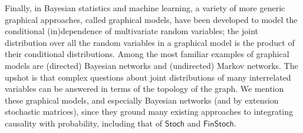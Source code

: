\documentclass[sigconf]{acmart}
\newcommand{\redout}[1]{{\color{red}#1}}
\newcommand{\Cat}[1]{\mathsf{#1}}
\def\Stoch{\Cat{Stoch}}
\def\FinStoch{\Cat{FinStoch}}
\begin{document}

Finally, in Bayesian statistics and machine learning, a variety of more generic graphical approaches, called graphical models, have been developed to model the conditional (in)dependence of multivariate random variables; the joint distribution over all the random variables in a graphical model is the product of their conditional distributions. Among the most familiar examples of graphical models are (directed) Bayesian networks and (undirected) Markov networks. The upshot is that complex questions about joint distributions of many interrelated variables can be answered in terms of the topology of the graph. We mention these graphical models, and especially Bayesian networks (and by extension stochastic matrices), since they ground many existing approaches to integrating causality with probability, including that of $\Stoch$ and $\FinStoch$. %


\end{document}
